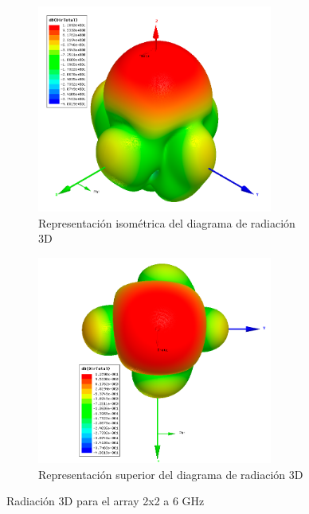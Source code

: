 \begin{figure}[H]
     \centering
     \begin{subfigure}[b]{0.7\textwidth}
         \centering
         \includegraphics[width=0.85\textwidth]{archivos/analisis/2x22/6}
         \caption{Representación isométrica del diagrama de radiación 3D}
         \label{fig:3d12x22}
     \end{subfigure}
     \hfill
     \begin{subfigure}[b]{0.7\textwidth}
         \centering
         \includegraphics[width=0.85\textwidth]{archivos/analisis/2x22/7}
         \caption{Representación superior del diagrama de radiación 3D}
         \label{fig:3d22x22}
     \end{subfigure}
     \hfill
        \caption{Radiación 3D para el array 2x2 a 6 GHz}
        \label{fig:3d2x22}
\end{figure}

